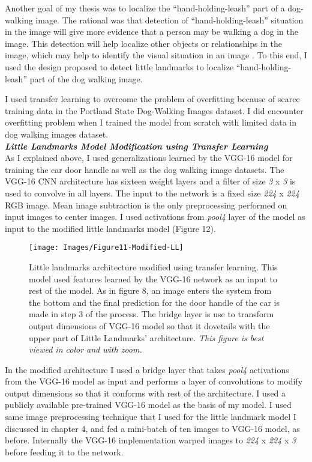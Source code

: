\documentclass [11pt,letterpaper ,openany ]{report}
\begin{document}
    Another goal of my thesis was to localize the ``hand-holding-leash'' part of a dog-walking image. The rational was that detection of ``hand-holding-leash'' situation in the image will give more evidence that a person may be walking a dog in the image. This detection will help localize other objects or relationships in the image, which may help to identify the visual situation in an image \cite{quinn2018semantic}. To this end, I used the design proposed to detect little landmarks \cite{Singh_2016_CVPR} to localize ``hand-holding-leash'' part of the dog walking image. 

    I used transfer learning to overcome the problem of overfitting because of scarce training data in the Portland State Dog-Walking Images dataset. I did encounter overfitting problem when I trained the model from scratch with limited data in dog walking images dataset. \\

    \noindent
    \textbf{\textit{Little Landmarks Model Modification using Transfer Learning}}\\                   
    As I explained above, I used generalizations learned by the VGG-16 model for training the car door handle as well as the dog walking image datasets.  The VGG-16 CNN architecture has sixteen weight layers and a filter of size \textit{3} x \textit{3} is used to convolve in all layers. The input to the network is a fixed size \textit{224} x \textit{224} RGB image. Mean image subtraction is the only preprocessing performed on input images to center images. I used activations from \textit{pool4} layer of the model as input to the modified little landmarks model (Figure 12).     

    \begin{figure}[h]
      \centering
      \texttt{[image: Images/Figure11-Modified-LL]}
      \caption{Little landmarks architecture modified using transfer learning. This model used features learned by the VGG-16 network as an input to rest of the model. As in figure 8, an image enters the system from the bottom and the final prediction for the door handle of the car is made in step 3 of the process. The bridge layer is use to transform output dimensions of VGG-16 model so that it dovetails with the upper part of Little Landmarks' architecture. \textit{This figure is best viewed in color and with zoom.}}
      \label{fig:tl_arch}
    \end{figure}        

    In the modified architecture I used a bridge layer that takes \textit{pool4} activations from the VGG-16 model as input and performs a layer of convolutions to modify output dimensions so that it conforms with rest of the architecture. I used a publicly available pre-trained VGG-16 model \cite{machrisaa2017} as the basis of my model. I used same image preprocessing technique that I used for the little landmark model I discussed in chapter 4, and fed a mini-batch of ten images to VGG-16 model, as before. Internally the VGG-16 implementation warped images to \textit{224} x \textit{224} x \textit{3} before feeding it to the network.    
\end{document}
